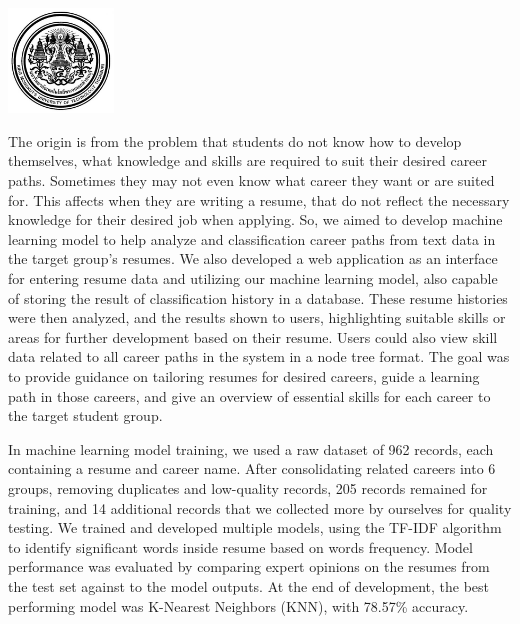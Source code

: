 \documentclass[12pt,oneside,openright,a4paper]{cpe-thai-project}
\begin{document}
\pdfstringdefDisableCommands{%
    \let\MakeUppercase\relax
}

\begin{center}
    \includegraphics[width=2.8cm]{logo02.jpg}
\end{center}
\vspace*{-1cm}

\maketitlepage
\makesignaturepage

\abstract

The origin is from the problem that students do not know how to develop themselves, what knowledge and skills are required to suit their 
desired career paths. Sometimes they may not even know what career they want or are suited for. This affects when they are writing a 
resume, that do not reflect the necessary knowledge for their desired job when applying.
So, we aimed to develop machine learning model to help analyze and classification career paths from text data in the target group's 
resumes. We also developed a web application as an interface for entering resume data and utilizing our machine learning model, also 
capable of storing the result of classification history in a database. These resume histories were then analyzed, and the results shown 
to users, highlighting suitable skills or areas for further development based on their resume. Users could also view skill data related 
to all career paths in the system in a node tree format. The goal was to provide guidance on tailoring resumes for desired careers, guide 
a learning path in those careers, and give an overview of essential skills for each career to the target student group.

In machine learning model training, we used a raw dataset of 962 records, each containing a resume and career name. After consolidating 
related careers into 6 groups, removing duplicates and low-quality records, 205 records remained for training, and 14 additional records 
that we collected more by ourselves for quality testing. We trained and developed multiple models, using the TF-IDF algorithm to 
identify significant words inside resume based on words frequency. Model performance was evaluated by comparing expert opinions on 
the resumes from the test set against to the model outputs. At the end of development, the best performing model was 
K-Nearest Neighbors (KNN), with 78.57\% accuracy.
\end{document}
